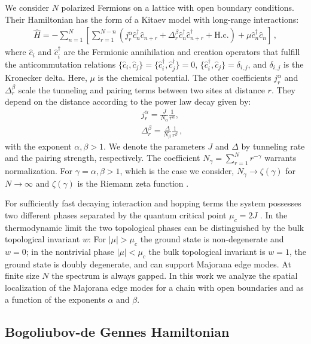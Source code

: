 \documentclass[pra,twocolumn,
superscriptaddress,
showpacs,
aps
]{revtex4-1}
\begin{document}
We consider $N$ polarized Fermions on a lattice with open boundary conditions. Their Hamiltonian has the form of a Kitaev model with long-range interactions: 
\begin{align}
\hat{H}=-\sum_{n=1}^N\left[\sum_{r=1}^{N-n}\left(j_r^{\alpha}\hat{c}_n^{\dag}\hat{c}_{n+r}+\Delta_r^{\beta}\hat{c}_n^{\dag}\hat{c}_{n+r}^{\dag}+\mathrm{H.c.}\right)+\mu\hat{c}_n^{\dag}\hat{c}_n\right]\,,\label{LRK}
\end{align}
where $\hat{c}_i$ and $\hat{c}_i^{\dag}$ are the Fermionic annihilation and creation operators that fulfill the anticommutation relations $\{\hat{c}_i,\hat{c}_j\}=\{\hat{c}_i^{\dag},\hat{c}_j^{\dag}\}=0$, ${\{\hat{c}_i^{\dag},\hat{c}_j\}=\delta_{i,j}}$, and $\delta_{i,j}$ is the Kronecker delta. Here, $\mu$ is the chemical potential. The other coefficients $j_r^{\alpha}$ and $\Delta_r^{\beta}$ scale the tunneling and pairing terms between two sites at distance $r$. They depend on the distance according to the power law decay given by: 
\begin{eqnarray}
&&j_r^{\alpha}=\frac{J}{N_\alpha}\frac{1}{r^{\alpha}},\\
&&\Delta_r^{\beta}=\frac{\Delta}{N_\beta}\frac{1}{r^{\beta}}\,,
\end{eqnarray}
with the exponent $\alpha,\beta>1$. We denote the parameters $J$ and $\Delta$ by tunneling rate and the pairing strength, respectively. The coefficient $N_{\gamma}=\sum_{r=1}^{N}r^{-\gamma}$ warrants normalization.  For $\gamma=\alpha,\beta>1$, which is the case we consider, $N_{\gamma}\to\zeta(\gamma)$ for $N\to\infty$ and $\zeta(\gamma)$ is the Riemann zeta function \cite{Olver:2010}. 

For sufficiently fast decaying interaction and hopping terms the system possesses two different phases separated by the quantum critical point $\mu_c=2J$ \cite{Kitaev2001}.  In the thermodynamic limit the two topological phases can be distinguished by the bulk topological invariant $w$: For $|\mu|>\mu_{c}$ the ground state is non-degenerate and $w=0$; in the nontrivial phase $|\mu|<\mu_{c}$ the bulk topological invariant is $w=1$,  the ground state is doubly degenerate, and can support Majorana edge modes. At finite size $N$ the spectrum is always gapped. In this work we analyze the spatial localization of the Majorana edge modes for a chain with open boundaries and as a function of the exponents $\alpha$ and $\beta$. 

\subsection{Bogoliubov-de Gennes Hamiltonian}
\end{document}
